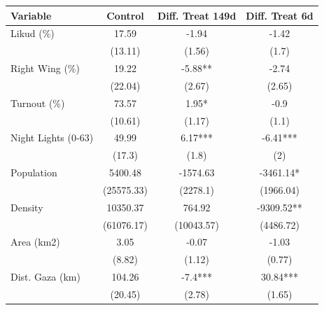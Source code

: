 \begin{table}[!h]
\centering
\begin{tabular}{lccc}
\toprule
Variable & Control & Diff. Treat 149d & Diff. Treat 6d\\
\midrule
Likud (\%) & 17.59 & -1.94 & -1.42\\
 & (13.11) & (1.56) & (1.7)\\
Right Wing (\%) & 19.22 & -5.88** & -2.74\\
 & (22.04) & (2.67) & (2.65)\\
Turnout (\%) & 73.57 & 1.95* & -0.9\\
\addlinespace
 & (10.61) & (1.17) & (1.1)\\
Night Lights (0-63) & 49.99 & 6.17*** & -6.41***\\
 & (17.3) & (1.8) & (2)\\
Population & 5400.48 & -1574.63 & -3461.14*\\
 & (25575.33) & (2278.1) & (1966.04)\\
\addlinespace
Density & 10350.37 & 764.92 & -9309.52**\\
 & (61076.17) & (10043.57) & (4486.72)\\
Area (km2) & 3.05 & -0.07 & -1.03\\
 & (8.82) & (1.12) & (0.77)\\
Dist. Gaza (km) & 104.26 & -7.4*** & 30.84***\\
\addlinespace
 & (20.45) & (2.78) & (1.65)\\
\bottomrule
\end{tabular}
\end{table}
